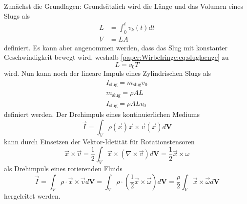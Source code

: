 Zunächst die Grundlagen:
Grundsätzlich wird die Länge und das Volumen eines Slugs als
\begin{align}
    L
    &=
    \int_{0}^{t}v_k(t)dt\\
    \label{paper:Wirbelringe:eq:sluglaenge}
    V
    &=
    LA
\end{align}
definiert.
Es kann aber angenommen werden, dass das Slug mit konstanter Geschwindigkeit bewegt wird, weshalb \ref{paper:Wirbelringe:eq:sluglaenge} zu
\begin{equation}
    L
    =
    v_0T
\end{equation}
wird.
Nun kann noch der lineare Impuls eines Zylindrischen Slugs als
\begin{align}
    I_{\text{slug}}
    =
    m_{\text{slug}}v_0\\
    m_{\text{slug}}
    =
    \rho AL\\
    I_{\text{slug}}
    =
    \rho ALv_0
    \label{paper:Wirbelringe:eq:slugImp}
\end{align}
definiert werden.
Der Drehimpuls eines kontinuierlichen Mediums
\begin{equation*}
    \vec{I}
    =
    \int_{V}\rho(\vec{x})\vec{x}\times\vec{v}(\vec{x})d\mathbf{V}
\end{equation*}
kann durch Einsetzen der Vektor-Idetität für Rotationstensoren \cite{Wirbelringe:batchelor1967}
\begin{equation*}
    \vec{x}\times\vec{v}
    =
    \frac{1}{2}\int_{V}\vec{x}\times(\nabla\times\vec{v})d\mathbf{V}
    =
    \frac{1}{2}\vec{x}\times\omega
\end{equation*}
als Drehimpuls eines rotierenden Fluids 
\begin{equation}
    \vec{I}
    =
    \int_{V}\rho\cdot\vec{x}\times\vec{v}d\mathbf{V}
    =
    \int_{V}\rho\cdot(\frac{1}{2}\vec{x}\times\vec{\omega})d\mathbf{V}
    =
    \frac{\rho}{2}\int_{V}\vec{x}\times\vec{\omega}d\mathbf{V}
    \label{paper:Wirbelringe:eq:Drehimpuls}
\end{equation}
hergeleitet werden. 

